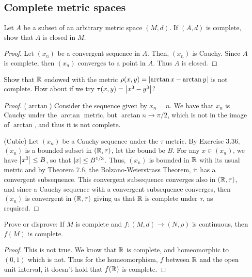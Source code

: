 \subsection{Complete metric spaces}


\begin{exercise}{12}
Let $A$ be a subset of an arbitrary metric space $(M,d)$.
If $(A,d)$ is complete, show that $A$ is closed in $M$.
\end{exercise}
\begin{proof}
Let $(x_n)$ be a convergent sequence in $A$.
Then, $(x_n)$ is Cauchy.
Since $A$ is complete, then $(x_n)$ converges to a point in $A$.
Thus $A$ is closed.
\end{proof} 

\begin{exercise}{13}
Show that $\mathbb{R}$ endowed with the metric $\rho(x,y)=\left\lvert \arctan x-\arctan y\right\rvert$ is not complete.
How about if we try $\tau(x,y)=\left\lvert x^3-y^3\right\rvert$?
\end{exercise}
\begin{proof}
($\arctan$)
Consider the sequence given by $x_n = n$.
We have that $x_n$ is Cauchy under the $\arctan$ metric, but $\arctan n\to \pi/2$, which is not in the image of $\arctan$, and thus it is not complete.

(Cubic)
Let $(x_n)$ be a Cauchy sequence under the $\tau$ metric.
By Exercise 3.36, $(x_n)$ is a bounded subset in $(\mathbb{R},\tau)$, let the bound be $B$.
For any $x\in (x_n)$, we have $\left\lvert x^3\right\rvert\leq B$, so that $\left\lvert x\right\rvert\leq B^{1/3}$.
Thus, $(x_n)$ is bounded in $\mathbb{R}$ with its usual metric and by Theorem 7.6, the Bolzano-Weierstrass Theorem, it has a convergent subsequence.
This convergent subsequence converges also in $(\mathbb{R},\tau)$, and since a Cauchy sequence with a convergent subsequence converges, then $(x_n)$ is convergent in $(\mathbb{R},\tau)$ giving us that $\mathbb{R}$ is complete under $\tau$, as required.
\end{proof} 

\begin{exercise}{15}
Prove or disprove:
If $M$ is complete and $f:(M,d)\to (N,\rho)$ is continuous, then $f(M)$ is complete.
\end{exercise}
\begin{proof}
This is not true.
We know that $\mathbb{R}$ is complete, and homeomorphic to $(0,1)$ which is not.
Thus for the homeomorphism, $f$ between $\mathbb{R}$ and the open unit interval, it doesn't hold that $f(\mathbb{R})$ is complete.
\end{proof} 

